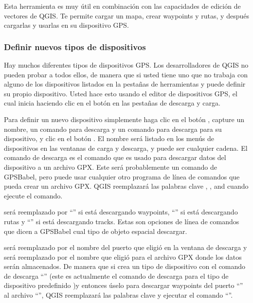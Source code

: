 Esta herramienta es muy útil en combinación con las capacidades de edición de vectores de QGIS. Te permite cargar un mapa, crear waypoints y rutas, y después cargarlas y usarlas en su dispositivo GPS.

\subsubsection{\label{sec:Defining-new-device}Definir nuevos tipos de dispositivos}

Hay muchos diferentes tipos de dispositivos GPS.
Los desarrolladores de QGIS no pueden probar a todos ellos, de manera que si usted tiene uno que no trabaja con alguno de los dispositivos listados en la pestañas de herramientas  y  puede definir su propio dispositivo.
Usted hace esto usando el editor de dispositivos GPS, el cual inicia haciendo clic en el botón  en las pestañas de descarga y carga.

Para definir un nuevo dispositivo simplemente haga clic en el botón , capture un nombre, un comando para descarga y un comando para descarga para su dispositivo, y clic en el botón .
El nombre será listado en los menús de dispositivos en las ventanas de carga y descarga, y puede ser cualquier cadena.
El comando de descarga es el comando que es usado para descargar datos del dispositivo a un archivo GPX.
Este será probablemente un comando de GPSBabel, pero puede usar cualquier otro programa de línea de comandos que pueda crear un archivo GPX.
QGIS reemplazará las palabras clave , , and  cuando ejecute el comando.

 será reemplazado por {}``'' si está descargando waypoints, {}``'' si está descargando rutas y {}``'' si está descargando tracks.
Estas son opciones de línea de comandos que dicen a GPSBabel cual tipo de objeto espacial descargar.

 será reemplazado por el nombre del puerto que eligió en la ventana de descarga y  será reemplazado por el nombre que eligió para el archivo GPX donde los datos serán almacenados.
De manera que si crea un tipo de dispositivo con el comando de descarga {}``'' (este es actualmente el comando de descarga para el tipo de dispositivo predefinido )y entonces úselo para descargar waypoints del puerto {}``'' al archivo {}``'', QGIS reemplazará las palabras clave y ejecutar el comando {}``''.


